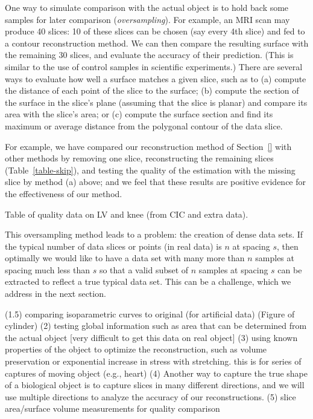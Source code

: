 One way to simulate comparison with the actual object is
to hold back some samples for later comparison ({\em oversampling}).
For example, an MRI scan may produce 40 slices: 10 of these slices
can be chosen (say every 4th slice) and fed to a contour reconstruction method.
We can then compare the resulting surface with the remaining 30 slices,
and evaluate the accuracy of their prediction.
(This is similar to the use of control samples in scientific experiments.)
There are several ways to evaluate how well a surface matches a given slice,
such as to
(a) compute the distance of each point of the slice to the surface;
(b) compute the section of the surface in the slice's plane (assuming that
the slice is planar) and compare its area with the slice's area;
or (c) compute the surface section and find its maximum or average distance
    from the polygonal contour of the data slice.

For example, we have compared our reconstruction method of Section~\ref{}
with other methods by removing one slice, reconstructing the remaining
slices (Table~\ref{table-skip}), and testing the quality of the estimation
with the missing slice by method (a) above; and 
we feel that these results are positive evidence for 
the effectiveness of our method.

\begin{table}
\label{table-skip}
Table of quality data on LV and knee (from CIC and extra data).
\end{table}

This oversampling method leads to a problem: the creation of dense data sets.
If the typical number of data slices or points (in real data)
is $n$ at spacing $s$, 
then optimally we would like to have a data set with many more than $n$ samples
at spacing much less than $s$ so that a valid subset of $n$ samples at spacing
$s$ can be extracted to reflect a true typical data set.
This can be a challenge, which we address in the next section.



(1.5)  comparing isoparametric curves to original (for artificial data)
		(Figure of cylinder)
(2) testing global information such as area that can be determined from the actual object
	[very difficult to get this data on real object]
(3) using known properties of the object to optimize the reconstruction,
    such as volume preservation or exponential increase in stress with stretching.
	this is for series of captures of moving object (e.g., heart)
(4) Another way to capture the true shape of a biological object
	is to capture slices in many different directions, and we will
	use multiple directions to analyze the accuracy of our reconstructions.
(5) slice area/surface volume measurements for quality comparison 


